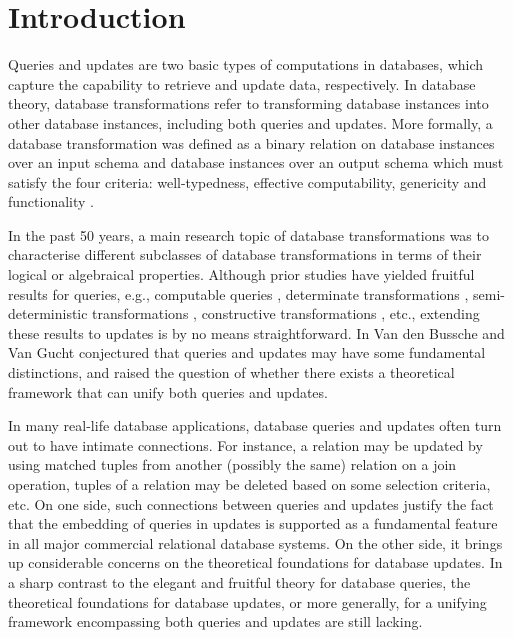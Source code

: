 \documentclass[preprint,11pt]{elsarticle}
\theoremstyle{definition}
\theoremstyle{remark}
\begin{document}
\section{Introduction}

Queries and updates are two basic types of computations in databases, which
capture the capability to retrieve and update data, respectively. In database theory, database transformations refer to transforming database instances into other database instances, including both queries and updates. More formally, a database transformation
was defined as a binary relation on database instances over an input
schema and database instances over an output schema which must satisfy the four criteria:
well-typedness, effective computability, genericity and
functionality \cite{AbiteboulIQL89,AbiteboulDatalogExtension}.

In the past 50 years, a main research topic of database transformations was to characterise different subclasses of database transformations in terms of their logical or algebraical properties. Although prior
studies have yielded fruitful results for queries, e.g., computable queries
\cite{ChandraCompleteness}, determinate transformations
\cite{AbiteboulIQL89}, semi-deterministic transformations
\cite{VandenBusscheSemideterminism}, constructive transformations
\cite{VandenBusscheThesis,VandenBusscheCompleteness}, etc., extending these results to updates is by no means
straightforward. In \cite{VandenBusscheNondeterministic} {Van den Bussche} and {Van Gucht}
conjectured that queries and updates may have some fundamental
distinctions, and raised the question of whether there exists a theoretical
framework that can unify both queries and updates.


In many real-life database applications, database queries and
updates often turn out to have intimate connections. For instance, a relation may be updated by using matched tuples from another
(possibly the same) relation on a join operation, tuples of a relation may be deleted based on
some selection criteria, etc. On one side, such connections between
queries and updates justify the fact that the embedding of queries
in updates is supported as a fundamental feature in all major
commercial relational database systems. On the other side, it brings
up considerable concerns on the theoretical foundations for database
updates. In a sharp contrast to the elegant and fruitful theory for
database queries, the theoretical foundations for database updates,
or more generally, for a unifying framework encompassing
both queries and updates are still lacking.
\end{document}
